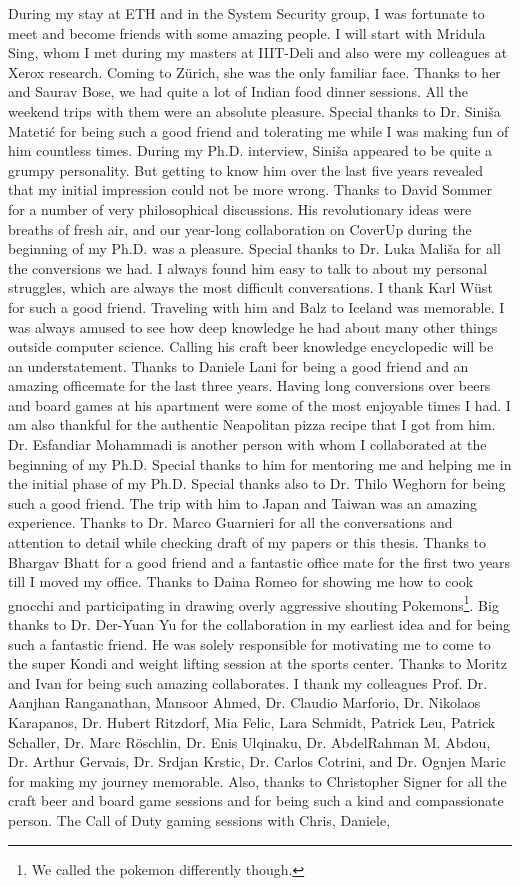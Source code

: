 During my stay at ETH and in the System Security group, I was fortunate to meet and become friends with some amazing people. I will start with Mridula Sing, whom I met during my masters at IIIT-Deli and also were my colleagues at Xerox research. Coming to Z\"urich, she was the only familiar face. Thanks to her and Saurav Bose, we had quite a lot of Indian food dinner sessions. All the weekend trips with them were an absolute pleasure. Special thanks to Dr. Sini\v{s}a Mateti\'c for being such a good friend and tolerating me while I was making fun of him countless times. During my Ph.D. interview, Sini\v{s}a appeared to be quite a grumpy personality. But getting to know him over the last five years revealed that my initial impression could not be more wrong. Thanks to David Sommer for a number of very philosophical discussions. His revolutionary ideas were breaths of fresh air, and our year-long collaboration on CoverUp during the beginning of my Ph.D. was a pleasure. Special thanks to Dr. Luka Mali\v{s}a for all the conversions we had. I always found him easy to talk to about my personal struggles, which are always the most difficult conversations. I thank Karl W\"ust for such a good friend. Traveling with him and Balz to Iceland was memorable. I was always amused to see how deep knowledge he had about many other things outside computer science. Calling his craft beer knowledge encyclopedic will be an understatement. Thanks to Daniele Lani for being a good friend and an amazing officemate for the last three years. Having long conversions over beers and board games at his apartment were some of the most enjoyable times I had. I am also thankful for the authentic Neapolitan pizza recipe that I got from him. Dr. Esfandiar Mohammadi is another person with whom I collaborated at the beginning of my Ph.D. Special thanks to him for mentoring me and helping me in the initial phase of my Ph.D. Special thanks also to Dr. Thilo Weghorn for being such a good friend. The trip with him to Japan and Taiwan was an amazing experience. Thanks to Dr. Marco Guarnieri for all the conversations and attention to detail while checking draft of my papers or this thesis. Thanks to Bhargav Bhatt for a good friend and a fantastic office mate for the first two years till I moved my office. Thanks to Daina Romeo for showing me how to cook gnocchi and participating in drawing overly aggressive shouting Pokemons\footnote{We called the pokemon differently though.}. Big thanks to Dr. Der-Yuan Yu for the collaboration in my earliest idea and for being such a fantastic friend. He was solely responsible for motivating me to come to the super Kondi and weight lifting session at the sports center. Thanks to Moritz and Ivan for being such amazing collaborates. I thank my colleagues  Prof. Dr. Aanjhan Ranganathan, Mansoor Ahmed, Dr. Claudio Marforio, Dr. Nikolaos Karapanos, Dr. Hubert Ritzdorf, Mia Felic, Lara Schmidt, Patrick Leu, Patrick Schaller, Dr. Marc R\"oschlin, Dr. Enis Ulqinaku, Dr. AbdelRahman M. Abdou, Dr. Arthur Gervais, Dr. Srdjan Krstic, Dr. Carlos Cotrini, and Dr. Ognjen Maric for making my journey memorable. Also, thanks to Christopher Signer for all the craft beer and board game sessions and for being such a kind and compassionate person. The Call of Duty gaming sessions with Chris, Daniele, 